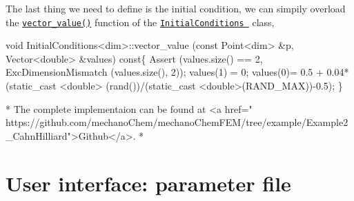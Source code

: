 The last thing we need to define is the initial condition, we can simpily overload the \href{../html/class_initial_conditions.html#aa10cfdd7350c3810a8deab707f397657}{\tt vector\-\_\-value()} function of the \href{../html/class_initial_conditions.html}{\tt Initial\-Conditions } class, 
\begin{DoxyCode}
\textcolor{keywordtype}{void} InitialConditions<dim>::vector_value (\textcolor{keyword}{const} Point<dim>   &p, Vector<double>   &values)\textcolor{keyword}{ const}\{
  Assert (values.size() == 2, ExcDimensionMismatch (values.size(), 2));
  values(1) = 0;    
 values(0)= 0.5 + 0.04*(static\_cast <\textcolor{keywordtype}{double}> (rand())/(static\_cast <double>(RAND\_MAX))-0.5);
\}

* The complete implementaion can be found at  <a href=\textcolor{stringliteral}{"
      https://github.com/mechanoChem/mechanoChemFEM/tree/example/Example2\_CahnHilliard"}>Github</a>. 
* 
\end{DoxyCode}
\hypertarget{growth_file}{}\section{User interface\-: parameter file}\label{growth_file}

